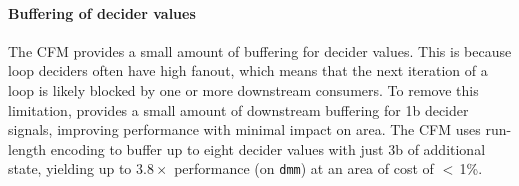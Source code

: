 


\paragraph{Buffering of decider values}
The CFM provides a small amount of buffering for decider values.
% 
This is because loop deciders often have high fanout, which means that the next iteration of a loop is likely blocked by one or more downstream consumers.
% 
To remove this limitation, \riptide provides a small amount of downstream buffering for 1b decider signals, improving performance with minimal impact on area.
%
The CFM uses run-length encoding to buffer up to eight decider values with just 3b of additional state, yielding up to $3.8\times$ performance (on {\tt dmm}) at an area of cost of $<$\,1\%.
